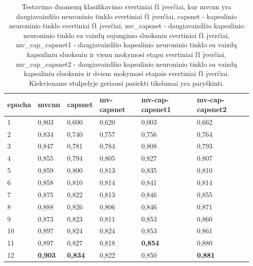 \begin{table}[]
	\caption{
		Testavimo duomenų klasifikavimo svertiniai f1 įverčiai, kur mvcnn yra daugiavaizdžio neuroninio tinklo svertiniai f1 įverčiai, capsnet - kapsulinio neuroninio tinklo svertiniai f1 įverčiai, mv\_capsnet - daugiavaizdžio kapsulinio neuroninio tinklo su vaizdų sujungimo sluoksniu svertiniai f1 įverčiai, mv\_cap\_capsnet1 - daugiavaizdžio kapsulinio neuroninio tinklo su vaizdų kapsuliniu sluoksniu ir vienu mokymosi etapu svertiniai f1 įverčiai, mv\_cap\_capsnet2 - daugiavaizdžio kapsulinio neuroninio tinklo su vaizdų kapsuliniu sluoksniu ir dviem mokymosi etapais svertiniai f1 įverčiai. Kiekviename stulpelyje geriausi pasiekti tikslumai yra paryškinti.
	}
	\begin{tabular}{l|l|l|l|l|l}
		epocha & mvcnn & capsnet & mv-capsnet & mv-cap-capsnet1 & mv-cap-capsnet2 \\
		\hline
		1 & 0,803 &   0,600 &      0,620 &           0,003 &           0,662 \\
		2 & 0,834 &   0,740 &      0,757 &           0,756 &           0,764 \\
		3 & 0,847 &   0,781 &      0,784 &           0,808 &           0,793 \\
		4 & 0,855 &   0,794 &      0,805 &           0,827 &           0,807 \\
		5 & 0,859 &   0,800 &      0,813 &           0,835 &           0,810 \\
		6 & 0,858 &   0,810 &      0,814 &           0,841 &           0,814 \\
		7 & 0,875 &   0,822 &      0,813 &           0,846 &           0,855 \\
		8 & 0,888 &   0,826 &      0,806 &           0,846 &           0,871 \\
		9 & 0,873 &   0,823 &      0,811 &           0,853 &           0,860 \\
		10 & 0,897 &   0,824 &      0,824 &           0,853 &           0,861 \\
		11 & 0,897 &   0,827 &      0,818 &           \textbf{0,854} &           0,880 \\
		12 & \textbf{0,903} &  \textbf{ 0,834} &      0,822 &           0,850 &           \textbf{0,881} \\
	\end{tabular}
	\label{tbl:weighted_f1}
\end{table}

